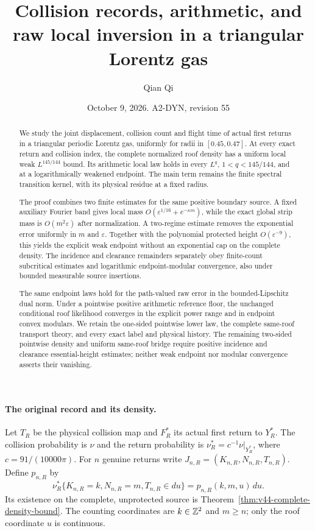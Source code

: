 \documentclass[11pt,reqno]{amsart}
\title[Collision records and raw local inversion]{Collision records, arithmetic, and raw local inversion in a triangular Lorentz gas}
\author{Qian Qi}
\date{October 9, 2026. A2-DYN, revision 55}
\numberwithin{equation}{section}
\theoremstyle{definition}\newtheorem{definition}[theorem]{Definition}
\theoremstyle{remark}\newtheorem{remark}[theorem]{Remark}
\begin{document}
\raggedbottom
\begin{abstract}
We study the joint displacement, collision count and flight time of
actual first returns in a triangular periodic Lorentz gas, uniformly
for radii in $[0.45,0.47]$. At every exact return and collision index,
the complete normalized roof density has a uniform local weak
$L^{145/144}$ bound. Its arithmetic local law holds in every
$L^q$, $1<q<145/144$, and at a logarithmically weakened endpoint.
The main term remains the finite spectral transition kernel, with its
physical residue at a fixed radius.

The proof combines two finite estimates for the same positive boundary
source. A fixed auxiliary Fourier band gives local mass
$O(\varepsilon^{1/16}+e^{-\kappa m})$, while the exact global strip
mass is $O(m^2\varepsilon)$ after normalization. A two-regime estimate
removes the exponential error uniformly in $m$ and $\varepsilon$.
Together with the polynomial protected height
$O(\varepsilon^{-9})$, this yields the explicit weak endpoint without
an exponential cap on the complete density. The incidence and clearance
remainders separately obey finite-count subcritical estimates and
logarithmic endpoint-modular convergence, also under bounded measurable
source insertions.

The same endpoint laws hold for the path-valued raw error in the
bounded-Lipschitz dual norm. Under a pointwise positive arithmetic
reference floor, the unchanged conditional roof likelihood converges
in the explicit power range and in endpoint convex modulars.
We retain the one-sided pointwise lower law, the complete same-roof
transport theory, and every exact label and physical history. The
remaining two-sided pointwise density and uniform same-roof bridge
require positive incidence and clearance essential-height estimates;
neither weak endpoint nor modular convergence asserts their vanishing.
\end{abstract}
\maketitle

\paragraph{The original record and its density.}
Let $T_R$ be the physical collision map and $F_R^*$ its actual first
return to $Y_R^*$. The collision probability is $\nu$ and the return
probability is $\nu_R^*=c^{-1}\nu|_{Y_R^*}$, where
$c=91/(10000\pi)$. For $n$ genuine returns write
$J_{n,R}=(K_{n,R},N_{n,R},T_{n,R})$. Define $p_{n,R}$ by
\[
 \nu_R^*\{K_{n,R}=k,N_{n,R}=m,T_{n,R}\in du\}
                  =p_{n,R}(k,m,u)\,du.
\]
Its existence on the complete, unprotected source is
Theorem~\ref{thm:v44-complete-density-bound}. The counting coordinates
are $k\in\mathbb Z^2$ and $m\ge n$; only the roof coordinate $u$ is continuous.
\end{document}
